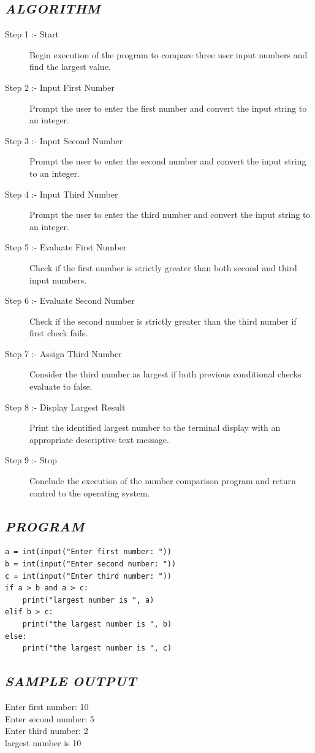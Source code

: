 \documentclass[11pt,a4paper]{article}
\begin{document}
\subsection*{\textit{ALGORITHM}}
\begin{description}
  \item[Step 1 :- Start] Begin execution of the program to compare three user input numbers and find the largest value.
  \item[Step 2 :- Input First Number] Prompt the user to enter the first number and convert the input string to an integer.
  \item[Step 3 :- Input Second Number] Prompt the user to enter the second number and convert the input string to an integer.
  \item[Step 4 :- Input Third Number] Prompt the user to enter the third number and convert the input string to an integer.
  \item[Step 5 :- Evaluate First Number] Check if the first number is strictly greater than both second and third input numbers.
  \item[Step 6 :- Evaluate Second Number] Check if the second number is strictly greater than the third number if first check fails.
  \item[Step 7 :- Assign Third Number] Consider the third number as largest if both previous conditional checks evaluate to false.
  \item[Step 8 :- Display Largest Result] Print the identified largest number to the terminal display with an appropriate descriptive text message.
  \item[Step 9 :- Stop] Conclude the execution of the number comparison program and return control to the operating system.
\end{description}

\subsection*{\textit{PROGRAM}}
\begin{lstlisting}[style=pythonstyle]
a = int(input("Enter first number: ")) 
b = int(input("Enter second number: ")) 
c = int(input("Enter third number: ")) 
if a > b and a > c: 
    print("largest number is ", a) 
elif b > c: 
    print("the largest number is ", b) 
else: 
    print("the largest number is ", c)
\end{lstlisting}

\subsection*{\textit{SAMPLE OUTPUT}}
\begin{tcolorbox}[colback=black!85,colframe=navyblue,title=\textbf{Terminal Output},coltitle=white,fonttitle=\bfseries\small]
\small\ttfamily\color{green!30!white}
Enter first number: 10\\
Enter second number: 5\\
Enter third number: 2\\
largest number is 10
\end{tcolorbox}
\end{document}
